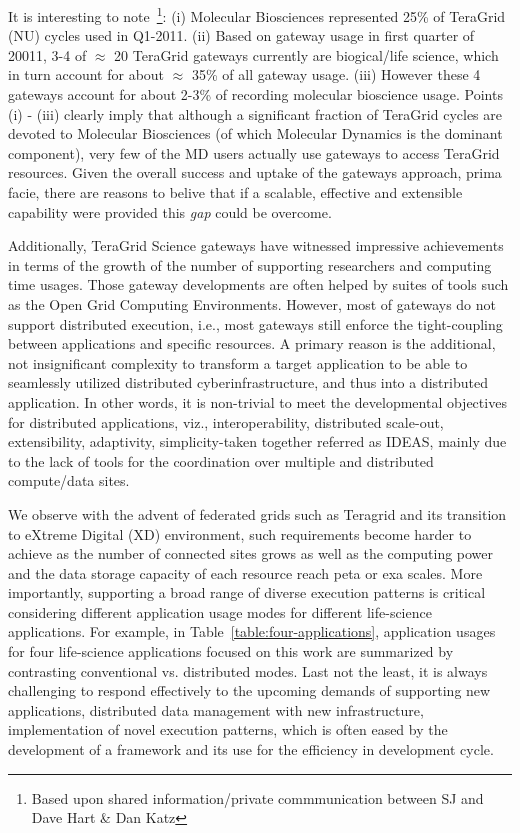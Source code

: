 \documentclass{sig-alternate}
\begin{document}
It is interesting to note~\footnote{Based upon shared
  information/private commmunication between SJ and Dave Hart \& Dan
  Katz}: (i) Molecular Biosciences represented 25\% of TeraGrid (NU)
cycles used in Q1-2011.  (ii) Based on gateway usage in first quarter
of 20011, 3-4 of $\approx$ 20 TeraGrid gateways currently are
biogical/life science, which in turn account for about $\approx$ 35\%
of all gateway usage. (iii) However these 4 gateways account for about
2-3\% of recording molecular bioscience usage. Points (i) - (iii)
clearly imply that although a significant fraction of TeraGrid cycles
are devoted to Molecular Biosciences (of which Molecular Dynamics is
the dominant component), very few of the MD users actually use
gateways to access TeraGrid resources.  Given the overall success and
uptake of the gateways approach, prima facie, there are reasons to
belive that if a scalable, effective and extensible capability were
provided this {\it gap} could be overcome.
 

Additionally, TeraGrid Science gateways have witnessed
impressive achievements in terms of the growth of the number of
supporting researchers and computing time usages.  Those gateway developments are often helped by suites of tools such as the Open Grid Computing Environments\cite{ogce-2010}.  However, most of
gateways do not support distributed execution, i.e., most gateways
still enforce the tight-coupling between applications and specific
resources.  A primary reason is the additional, not insignificant
complexity to transform a target application to be able to seamlessly
utilized distributed cyberinfrastructure, and thus into a distributed
application.  In other words, it is non-trivial to meet the
developmental objectives for distributed applications, viz.,
interoperability, distributed scale-out, extensibility, adaptivity,
simplicity-taken together referred as IDEAS\cite{ideas}, mainly due to
the lack of tools for the coordination over multiple and distributed
compute/data sites.

We observe with the advent of federated grids such as Teragrid and its
transition to eXtreme Digital (XD) environment, such requirements
become harder to achieve as the number of connected sites grows as
well as the computing power and the data storage capacity of each
resource reach peta or exa scales.  More importantly, supporting a
broad range of diverse execution patterns is critical considering
different application usage modes for different life-science
applications.  For example, in Table~\ref{table:four-applications},
application usages for four life-science applications focused on this
work are summarized by contrasting conventional vs. distributed modes.
Last not the least, it is always challenging to respond effectively to
the upcoming demands of supporting new applications, distributed data
management with new infrastructure, implementation of novel execution
patterns, which is often eased by the development of a framework and
its use for the efficiency in development cycle.
 
\end{document}
